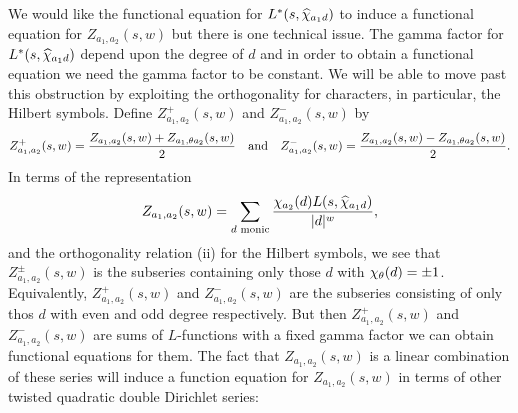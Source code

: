 \documentclass[12pt,reqno,oneside]{amsart}
\begin{document}
    We would like the functional equation for $L^{\ast}(s,\widehat{\chi}_{a_{1}d})$ to induce a functional equation for $Z_{a_{1},a_{2}}(s,w)$ but there is one technical issue. The gamma factor for $L^{\ast}(s,\widehat{\chi}_{a_{1}d})$ depend upon the degree of $d$ and in order to obtain a functional equation we need the gamma factor to be constant. We will be able to move past this obstruction by exploiting the orthogonality for characters, in particular, the Hilbert symbols. Define $Z_{a_{1},a_{2}}^{+}(s,w)$ and $Z_{a_{1},a_{2}}^{-}(s,w)$ by
    \[
        Z_{a_{1},a_{2}}^{+}(s,w) = \frac{Z_{a_{1},a_{2}}(s,w)+Z_{a_{1},\theta a_{2}}(s,w)}{2} \quad \text{and} \quad Z_{a_{1},a_{2}}^{-}(s,w) = \frac{Z_{a_{1},a_{2}}(s,w)-{Z_{a_{1},\theta a_{2}}(s,w)}}{2}.
    \]
    In terms of the representation
    \[
        Z_{a_{1},a_{2}}(s,w) = \sum_{\text{$d$ monic}}\frac{\chi_{a_{2}}(d)L(s,\widehat{\chi}_{a_{1}d})}{|d|^{w}},
    \]
    and the orthogonality relation (ii) for the Hilbert symbols, we see that $Z_{a_{1},a_{2}}^{\pm}(s,w)$ is the subseries containing only those $d$ with $\chi_{\theta}(d) = \pm 1$. Equivalently, $Z_{a_{1},a_{2}}^{+}(s,w)$ and $Z_{a_{1},a_{2}}^{-}(s,w)$ are the subseries consisting of only thos $d$ with even and odd degree respectively. But then $Z_{a_{1},a_{2}}^{+}(s,w)$ and $Z_{a_{1},a_{2}}^{-}(s,w)$ are sums of $L$-functions with a fixed gamma factor we can obtain functional equations for them. The fact that $Z_{a_{1},a_{2}}(s,w)$ is a linear combination of these series will induce a function equation for $Z_{a_{1},a_{2}}(s,w)$ in terms of other twisted quadratic double Dirichlet series:
\end{document}
